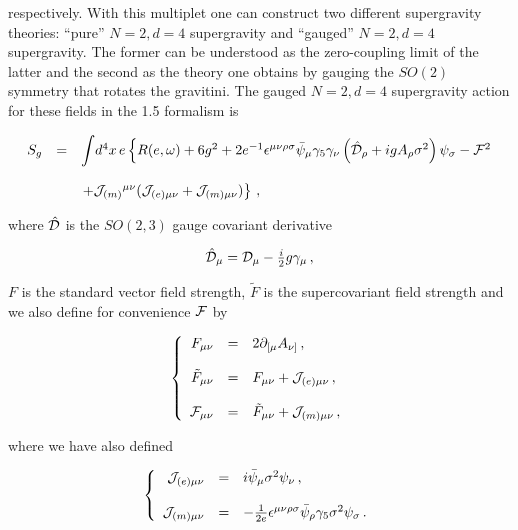 \documentclass[12pt,a4paper]{article}
\begin{document}
\noindent respectively. With this multiplet one can construct two
different supergravity theories: ``pure'' $N=2,d=4$ supergravity and
``gauged'' $N=2,d=4$ supergravity. The former can be understood as the
zero-coupling limit of the latter and the second as the theory one
obtains by gauging the $SO(2)$ symmetry that rotates the gravitini.
The gauged $N=2,d=4$ supergravity action for these fields in the 1.5
formalism is

\begin{equation}
\begin{array}{rcl}
S_{g} & = & {\displaystyle\int} d^{4}x\, e \left\{ R(e,\omega) +6g^{2}
+2 e^{-1}\epsilon^{\mu\nu\rho\sigma}\bar{\psi}_{\mu}\gamma_{5}\gamma_{\nu}
\left(\hat{\cal D}_{\rho}+ig A_{\rho}\sigma^{2}\right)\psi_{\sigma}
-{\cal F}^{2} \right.\\
& & \\
& & 
\left. 
+{\cal J}_{(m)}{}^{\mu\nu}
({\cal J}_{(e) \mu\nu} +{\cal J}_{(m) \mu\nu}) \right\}\, ,
\end{array}
\end{equation}

\noindent where  $\hat{\cal D}$ is the $SO(2,3)$ gauge 
covariant derivative

\begin{equation}
\hat{\cal D}_{\mu} = {\cal D}_{\mu} 
-{\textstyle\frac{i}{2}}g\gamma_{\mu}\, ,
\end{equation}

\noindent  $F$ is the standard vector field strength, 
$\tilde{F}$ is the supercovariant field strength and we also 
define for convenience ${\cal F}$ by

\begin{equation}
\left\{
\begin{array}{rcl}
F_{\mu\nu} & = & 2\partial_{[\mu} A_{\nu]}\, ,\\
& & \\
\tilde{F}_{\mu\nu} & = & F_{\mu\nu} +{\cal J}_{(e) \mu\nu}\, ,\\
& & \\
{\cal F}_{\mu\nu} & = &  \tilde{F}_{\mu\nu} +{\cal J}_{(m) \mu\nu}\, , \\
\end{array}
\right.
\end{equation}

\noindent where we have also defined

\begin{equation}
\left\{
\begin{array}{rcl}
{\cal J}_{(e) \mu\nu} & = & i\bar{\psi}_{\mu}\sigma^{2}\psi_{\nu}\, ,\\
& & \\
{\cal J}_{(m) \mu\nu} & = & -\frac{1}{2e}\epsilon^{\mu\nu\rho\sigma}
\bar{\psi}_{\rho}\gamma_{5}\sigma^{2}\psi_{\sigma}\, .\\
\end{array}
\right.
\end{equation}
\end{document}
